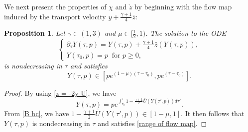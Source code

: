 \documentclass{article}
\newcommand{\ga}{\gamma}
\newcommand{\pa}{\partial}
\def\be{\begin{equation}}
\def\ee{\end{equation}}
\numberwithin{equation}{section}
\newtheorem{proposition}[theorem]{Proposition}
\begin{document}
We next present the properties of $\chi$ and $\mathring z$ 
by beginning with the flow map induced by the transport velocity $y+\frac{\ga+1}{4}\bar z $: 
\begin{proposition}\label{prop Y(tau,p)}
	Let $\ga\in(1,3)$ and $\mu\in[\frac12,1)$. The solution to the ODE 
	\be\label{Lagrangian flow map}
		\begin{cases}
			\pa_\tau Y(\tau,p) = Y(\tau,p)+\frac{\ga+1}{4}\bar z(Y(\tau,p)),\\
			Y(\tau_0,p) = p\  \text{ for } p\geq 0,
		\end{cases}
	\ee
	is nondecreasing in $\tau$ and satisfies
	\be\label{range of flow map}
		Y(\tau,p) \in [pe^{(1-\mu)(\tau-\tau_0)},pe^{(\tau-\tau_0)} ].
	\ee
\end{proposition}
\begin{proof}
By using \eqref{z = -2y U}, we have   
	\be\label{eq Y(tau,p)}
		Y(\tau,p) %
        = p e^{\int_{\tau_0}^\tau 1-\frac{\ga+1}{2} \bar U(Y(\tau',p)) d\tau'}.
	\ee
   From \eqref{B bc}, we have $1-\frac{\ga+1}{2} \bar U(Y(\tau',p)) \in[1-\mu,1]$. It then follows that $Y(\tau,p)$ is nondecreasing in $\tau$
    and satisfies \eqref{range of flow map}. 
\end{proof}
\end{document}
